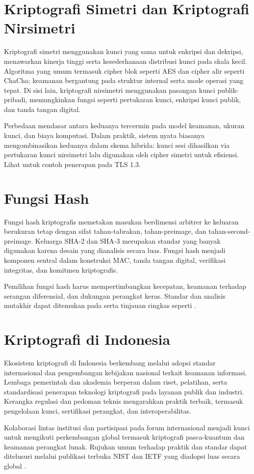 \documentclass[../main.tex]{subfiles}
\begin{document}
\section{Kriptografi Simetri dan Kriptografi Nirsimetri}
Kriptografi simetri menggunakan kunci yang sama untuk enkripsi dan dekripsi, menawarkan kinerja tinggi serta kesederhanaan distribusi kunci pada skala kecil. Algoritma yang umum termasuk cipher blok seperti AES dan cipher alir seperti ChaCha; keamanan bergantung pada struktur internal serta mode operasi yang tepat. Di sisi lain, kriptografi nirsimetri menggunakan pasangan kunci publik-pribadi, memungkinkan fungsi seperti pertukaran kunci, enkripsi kunci publik, dan tanda tangan digital.

Perbedaan mendasar antara keduanya tercermin pada model keamanan, ukuran kunci, dan biaya komputasi. Dalam praktik, sistem nyata biasanya mengombinasikan keduanya dalam skema hibrida: kunci sesi dihasilkan via pertukaran kunci nirsimetri lalu digunakan oleh cipher simetri untuk efisiensi. Lihat \textcite{rfc8446} untuk contoh penerapan pada TLS 1.3.

\section{Fungsi Hash}
Fungsi hash kriptografis memetakan masukan berdimensi arbitrer ke keluaran berukuran tetap dengan sifat tahan-tabrakan, tahan-preimage, dan tahan-second-preimage. Keluarga SHA-2 dan SHA-3 merupakan standar yang banyak digunakan karena desain yang dianalisis secara luas. Fungsi hash menjadi komponen sentral dalam konstruksi MAC, tanda tangan digital, verifikasi integritas, dan komitmen kriptografis.

Pemilihan fungsi hash harus mempertimbangkan kecepatan, keamanan terhadap serangan diferensial, dan dukungan perangkat keras. Standar dan analisis mutakhir dapat ditemukan pada \textcite{fips1804,fips202} serta tinjauan ringkas seperti \textcite{bertoni2013keccak}.

\section{Kriptografi di Indonesia}
Ekosistem kriptografi di Indonesia berkembang melalui adopsi standar internasional dan pengembangan kebijakan nasional terkait keamanan informasi. Lembaga pemerintah dan akademia berperan dalam riset, pelatihan, serta standardisasi penerapan teknologi kriptografi pada layanan publik dan industri. Kerangka regulasi dan pedoman teknis mengarahkan praktik terbaik, termasuk pengelolaan kunci, sertifikasi perangkat, dan interoperabilitas.

Kolaborasi lintas institusi dan partisipasi pada forum internasional menjadi kunci untuk mengikuti perkembangan global termasuk kriptografi pasca-kuantum dan keamanan perangkat lunak. Rujukan umum terhadap praktik dan standar dapat ditelusuri melalui publikasi terbuka NIST dan IETF yang diadopsi luas secara global \parencite{nist-sp800-175b,rfc5280}.
\end{document}
